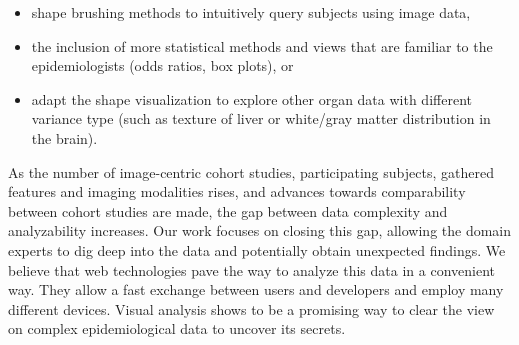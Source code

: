 \documentclass[journal]{style/vgtc} 			          %
\begin{document}
\begin{itemize}
	\item shape brushing methods to intuitively query subjects using image data,
	\item the inclusion of more statistical methods and views that are familiar to the epidemiologists (odds ratios, box plots), or
	\item adapt the shape visualization to explore other organ data with different variance type (such as texture of liver or white/gray matter distribution in the brain).
\end{itemize}
%
%
As the number of image-centric cohort studies, participating subjects, gathered features and imaging modalities rises, and advances towards comparability between cohort studies are made, the gap between data complexity and analyzability increases.
%
Our work focuses on closing this gap, allowing the domain experts to dig deep into the data and potentially obtain unexpected findings.
%
We believe that web technologies pave the way to analyze this data in a convenient way.
%
They allow a fast exchange between users and developers and employ many different devices.
%
Visual analysis shows to be a promising way to clear the view on complex epidemiological data to uncover its secrets.
\end{document}
